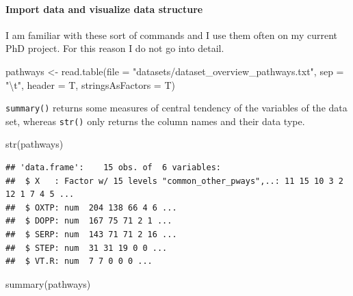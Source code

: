 \documentclass[
]{article}
\newenvironment{Shaded}{\begin{snugshade}}{\end{snugshade}}
\newcommand{\AttributeTok}[1]{\textcolor[rgb]{0.77,0.63,0.00}{#1}}
\newcommand{\FunctionTok}[1]{\textcolor[rgb]{0.00,0.00,0.00}{#1}}
\newcommand{\NormalTok}[1]{#1}
\newcommand{\OtherTok}[1]{\textcolor[rgb]{0.56,0.35,0.01}{#1}}
\newcommand{\SpecialCharTok}[1]{\textcolor[rgb]{0.00,0.00,0.00}{#1}}
\newcommand{\StringTok}[1]{\textcolor[rgb]{0.31,0.60,0.02}{#1}}
\begin{document}
\hypertarget{import-data-and-visualize-data-structure}{%
\paragraph{Import data and visualize data
structure}\label{import-data-and-visualize-data-structure}}

I am familiar with these sort of commands and I use them often on my
current PhD project. For this reason I do not go into detail.

\begin{Shaded}
\begin{Highlighting}[]
\NormalTok{pathways }\OtherTok{\textless{}{-}} \FunctionTok{read.table}\NormalTok{(}\AttributeTok{file =} \StringTok{"datasets/dataset\_overview\_pathways.txt"}\NormalTok{, }\AttributeTok{sep =} \StringTok{"}\SpecialCharTok{\textbackslash{}t}\StringTok{"}\NormalTok{, }\AttributeTok{header =}\NormalTok{ T, }\AttributeTok{stringsAsFactors =}\NormalTok{ T)}
\end{Highlighting}
\end{Shaded}

\texttt{summary()} returns some measures of central tendency of the
variables of the data set, whereas \texttt{str()} only returns the
column names and their data type.

\begin{Shaded}
\begin{Highlighting}[]
\FunctionTok{str}\NormalTok{(pathways)}
\end{Highlighting}
\end{Shaded}

\begin{verbatim}
## 'data.frame':    15 obs. of  6 variables:
##  $ X   : Factor w/ 15 levels "common_other_pways",..: 11 15 10 3 2 12 1 7 4 5 ...
##  $ OXTP: num  204 138 66 4 6 ...
##  $ DOPP: num  167 75 71 2 1 ...
##  $ SERP: num  143 71 71 2 16 ...
##  $ STEP: num  31 31 19 0 0 ...
##  $ VT.R: num  7 7 0 0 0 ...
\end{verbatim}

\begin{Shaded}
\begin{Highlighting}[]
\FunctionTok{summary}\NormalTok{(pathways)}
\end{Highlighting}
\end{Shaded}
\end{document}
